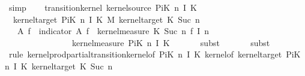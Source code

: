 \begin{isabellebody}
\ simp\isanewline
\ \ \isamarkupfalse%
\ {\isachardoublequoteopen}transition{\isacharunderscore}{\kern0pt}kernel\ {\isacharparenleft}{\kern0pt}kernel{\isacharunderscore}{\kern0pt}source\ {\isacharparenleft}{\kern0pt}PiK\ n\ I\ K{\isacharparenright}{\kern0pt}{\isacharparenright}{\kern0pt}\isanewline
\ \ {\isacharparenleft}{\kern0pt}kernel{\isacharunderscore}{\kern0pt}target\ {\isacharparenleft}{\kern0pt}PiK\ n\ I\ K{\isacharparenright}{\kern0pt}\ {\isasymOtimes}\isactrlsub M\ {\isacharparenleft}{\kern0pt}kernel{\isacharunderscore}{\kern0pt}target\ {\isacharparenleft}{\kern0pt}{\isacharquery}{\kern0pt}K\ {\isacharparenleft}{\kern0pt}Suc\ n{\isacharparenright}{\kern0pt}{\isacharparenright}{\kern0pt}{\isacharparenright}{\kern0pt}{\isacharparenright}{\kern0pt}\isanewline
\ \ {\isacharparenleft}{\kern0pt}{\isasymlambda}{\isasymomega}\ A{\isacharprime}{\kern0pt}{\isachardot}{\kern0pt}\ {\isasymintegral}\isactrlsup {\isacharplus}{\kern0pt}{\isasymomega}\isactrlsub f{\isachardot}{\kern0pt}\ {\isacharparenleft}{\kern0pt}{\isasymintegral}\isactrlsup {\isacharplus}{\kern0pt}{\isasymomega}{\isachardot}{\kern0pt}\ indicator\ A{\isacharprime}{\kern0pt}\ {\isacharparenleft}{\kern0pt}{\isasymomega}\isactrlsub f{\isacharcomma}{\kern0pt}\ {\isasymomega}{\isacharparenright}{\kern0pt}\ {\isasympartial}kernel{\isacharunderscore}{\kern0pt}measure\ {\isacharparenleft}{\kern0pt}{\isacharquery}{\kern0pt}K\ {\isacharparenleft}{\kern0pt}Suc\ n{\isacharparenright}{\kern0pt}{\isacharparenright}{\kern0pt}\ {\isacharparenleft}{\kern0pt}{\isasymomega}\isactrlsub f\ {\isacharparenleft}{\kern0pt}I\ n{\isacharparenright}{\kern0pt}{\isacharparenright}{\kern0pt}{\isacharparenright}{\kern0pt}\isanewline
\ \ \ \ \ \ \ \ \ \ \ \ \ \ \ \ {\isasympartial}kernel{\isacharunderscore}{\kern0pt}measure\ {\isacharparenleft}{\kern0pt}PiK\ n\ I\ K{\isacharparenright}{\kern0pt}\ {\isasymomega}{\isacharparenright}{\kern0pt}{\isachardoublequoteclose}\isanewline
\ \ \ \ \isamarkupfalse%
\ {\isacharparenleft}{\kern0pt}subst\ {}{\isacharparenright}{\kern0pt}\isanewline
\ \ \ \ \isamarkupfalse%
\ {\isacharparenleft}{\kern0pt}subst\ {}{\isacharparenright}{\kern0pt}\isanewline
\ \ \ \ \isamarkupfalse%
\ {\isacharparenleft}{\kern0pt}rule\ kernel{\isacharunderscore}{\kern0pt}prod{\isacharunderscore}{\kern0pt}partial{\isacharunderscore}{\kern0pt}transition{\isacharunderscore}{\kern0pt}kernel{\isacharbrackleft}{\kern0pt}of\ {\isachardoublequoteopen}PiK\ n\ I\ K{\isachardoublequoteclose}\ {\isachardoublequoteopen}kernel{\isacharunderscore}{\kern0pt}of\ {\isacharparenleft}{\kern0pt}kernel{\isacharunderscore}{\kern0pt}target\ {\isacharparenleft}{\kern0pt}PiK\ n\ I\ K{\isacharparenright}{\kern0pt}{\isacharparenright}{\kern0pt}\ {\isacharparenleft}{\kern0pt}kernel{\isacharunderscore}{\kern0pt}target\ {\isacharparenleft}{\kern0pt}{\isacharquery}{\kern0pt}K\ {\isacharparenleft}{\kern0pt}Suc\ n{\isacharparenright}{\kern0pt}{\isacharparenright}{\kern0pt}{\isacharparenright}{\kern0pt}\isanewline

\end{isabellebody}
